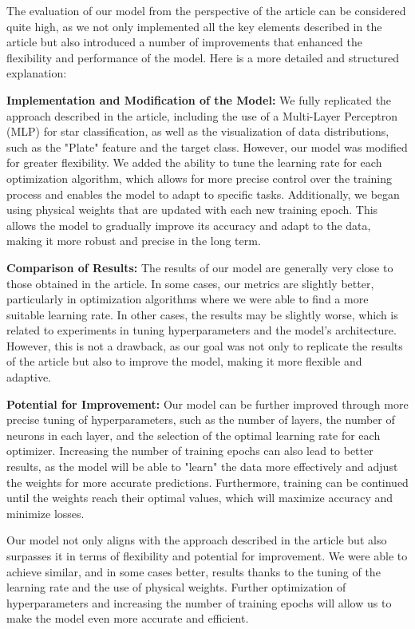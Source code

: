 \documentclass[journal,onecolumn]{IEEEtran}
\begin{document}
The evaluation of our model from the perspective of the article can be considered quite high, as we not only implemented all the key elements described in the article but also introduced a number of improvements that enhanced the flexibility and performance of the model. Here is a more detailed and structured explanation:

\textbf{Implementation and Modification of the Model:}  
We fully replicated the approach described in the article, including the use of a Multi-Layer Perceptron (MLP) for star classification, as well as the visualization of data distributions, such as the "Plate" feature and the target class. However, our model was modified for greater flexibility. We added the ability to tune the learning rate for each optimization algorithm, which allows for more precise control over the training process and enables the model to adapt to specific tasks. Additionally, we began using physical weights that are updated with each new training epoch. This allows the model to gradually improve its accuracy and adapt to the data, making it more robust and precise in the long term.

\textbf{Comparison of Results:}  
The results of our model are generally very close to those obtained in the article. In some cases, our metrics are slightly better, particularly in optimization algorithms where we were able to find a more suitable learning rate. In other cases, the results may be slightly worse, which is related to experiments in tuning hyperparameters and the model's architecture. However, this is not a drawback, as our goal was not only to replicate the results of the article but also to improve the model, making it more flexible and adaptive.

\textbf{Potential for Improvement:}  
Our model can be further improved through more precise tuning of hyperparameters, such as the number of layers, the number of neurons in each layer, and the selection of the optimal learning rate for each optimizer. Increasing the number of training epochs can also lead to better results, as the model will be able to "learn" the data more effectively and adjust the weights for more accurate predictions. Furthermore, training can be continued until the weights reach their optimal values, which will maximize accuracy and minimize losses.

Our model not only aligns with the approach described in the article but also surpasses it in terms of flexibility and potential for improvement. We were able to achieve similar, and in some cases better, results thanks to the tuning of the learning rate and the use of physical weights. Further optimization of hyperparameters and increasing the number of training epochs will allow us to make the model even more accurate and efficient.
\end{document}
